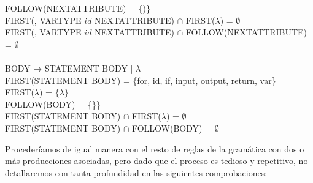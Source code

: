 \begin{tabbing}
    \> FOLLOW(NEXTATTRIBUTE) = \{)\}\\
    \> \> FIRST(, VARTYPE $id$ NEXTATTRIBUTE) $\cap$ FIRST($\lambda$) = $\emptyset$\\
    \> \> FIRST(, VARTYPE $id$ NEXTATTRIBUTE) $\cap$ FOLLOW(NEXTATTRIBUTE) = $\emptyset$\\
    \\
    BODY → STATEMENT BODY | $\lambda$\\
    \> FIRST(STATEMENT BODY) = \{for, id, if, input, output, return, var\}\\
    \> FIRST($\lambda$) = $\{\lambda\}$\\
    \> FOLLOW(BODY) = \{\}\}\\
    \> \> FIRST(STATEMENT BODY) $\cap$ FIRST($\lambda$) = $\emptyset$\\
    \> \> FIRST(STATEMENT BODY) $\cap$ FOLLOW(BODY) = $\emptyset$\\
\end{tabbing}
Procederíamos de igual manera con el resto de reglas de la gramática con dos o más producciones asociadas, pero dado que el proceso es tedioso y repetitivo, no detallaremos con tanta profundidad en las siguientes comprobaciones:
